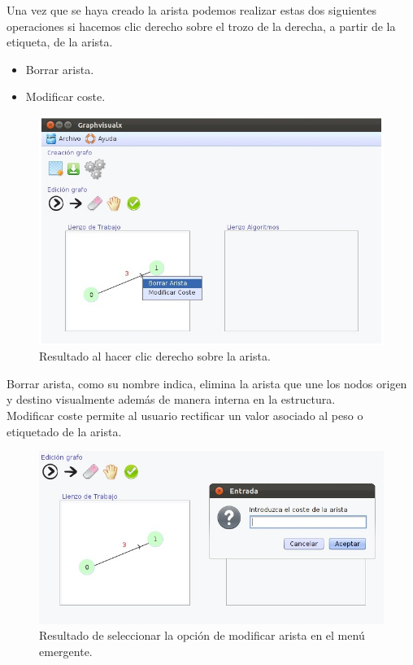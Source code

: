 Una vez que se haya creado la arista podemos realizar estas dos siguientes operaciones si hacemos clic derecho sobre el trozo de la derecha, a partir de la etiqueta, de la arista.

\begin{itemize}
\item Borrar arista. 
\item Modificar coste.
\end{itemize}
 
\begin{figure}[H]
\begin{center}
\includegraphics[width=15cm]{./imagenes_documentacion/imagen_nodos_con_arista_opcion_arista_modificada.jpeg}
\caption{Resultado al hacer clic derecho sobre la arista.}
\end{center}
\end{figure}

Borrar arista, como su nombre indica, elimina la arista que une los nodos origen y destino visualmente además de manera interna en la estructura.\\

Modificar coste permite al usuario rectificar un valor asociado al peso o etiquetado de la arista. \\

\newpage

\begin{figure}[H]
\begin{center}
\includegraphics[width=17cm]{./imagenes_documentacion/imagen_icono_modificar_arista.jpeg}
\caption{Resultado de seleccionar la opción de modificar arista en el menú emergente.}
\end{center}
\end{figure}


